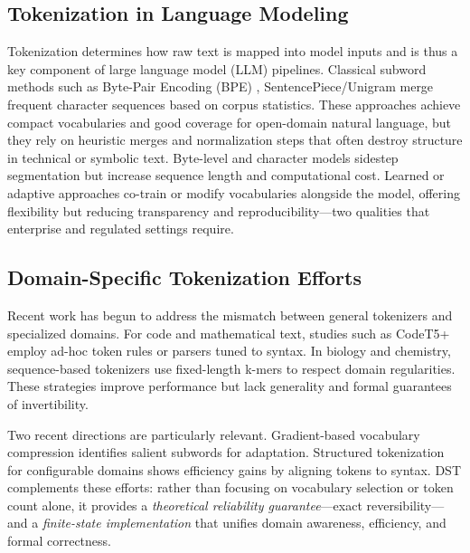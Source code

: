 \subsection{Tokenization in Language Modeling}

Tokenization determines how raw text is mapped into model inputs and is thus a key component of large language model (LLM) pipelines.
Classical subword methods such as Byte-Pair Encoding (BPE) \citep{Sennrich2016BPE}, SentencePiece/Unigram \citep{KudoRichardson2018SentencePiece, Kudo2018Unigram} merge frequent character sequences based on corpus statistics.
These approaches achieve compact vocabularies and good coverage for open-domain natural language, but they rely on heuristic merges and normalization steps that often destroy structure in technical or symbolic text.
Byte-level and character models \citep{Xue2022ByT5, Ding2023ByteLevelTradeoff} sidestep segmentation but increase sequence length and computational cost.
Learned or adaptive approaches \citep{Wei2024VocabCompression} co-train or modify vocabularies alongside the model, offering flexibility but reducing transparency and reproducibility—two qualities that enterprise and regulated settings require.

\subsection{Domain-Specific Tokenization Efforts}

Recent work has begun to address the mismatch between general tokenizers and specialized domains.
For code and mathematical text, studies such as CodeT5+ \citep{Jiang2023CodeT5Plus} employ ad-hoc token rules or parsers tuned to syntax.
In biology and chemistry, sequence-based tokenizers use fixed-length k-mers to respect domain regularities.
These strategies improve performance but lack generality and formal guarantees of invertibility.

Two recent directions are particularly relevant.
Gradient-based vocabulary compression \citep{Wei2024VocabCompression} identifies salient subwords for adaptation.
Structured tokenization for configurable domains \citep{Xu2024StructuredTokenization} shows efficiency gains by aligning tokens to syntax.
DST complements these efforts: rather than focusing on vocabulary selection or token count alone, it provides a \emph{theoretical reliability guarantee}—exact reversibility—and a \emph{finite-state implementation} that unifies domain awareness, efficiency, and formal correctness.

